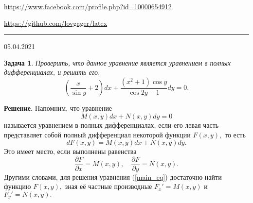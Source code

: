 \documentclass[12pt]{article}
\begin{document}


\begin{flushleft}
\url{https://www.facebook.com/profile.php?id=10000654912}

\url{https://github.com/lovgager/latex}
\end{flushleft}
\hrule 
\begin{flushright}
05.04.2021
\end{flushright}
\bigskip


\newtheorem*{task}{Задача}
\begin{task}
Проверить, что данное уравнение является уравнением в полных дифференциалах, и решить его.
\begin{equation} \label{task_eq}
    \left(\frac{x}{\sin{y}}+2\right)dx + \frac{(x^2+1) \cos{y}}{\cos{2y}-1}dy = 0. 
\end{equation}
\end{task}

\noindent\textbf{Решение.} Напомним, что уравнение
\begin{equation}\label{main_eq}
    M(x,y)dx + N(x,y)dy = 0
\end{equation}
называется уравнением в полных дифференциалах, если его левая часть представляет собой полный дифференциал некоторой функции $F(x,y),$ то есть 
\begin{equation*}
    dF(x,y) = M(x,y)dx + N(x,y)dy.
\end{equation*}
Это имеет место, если выполнены равенства
\begin{equation}\label{partial_der}
    \frac{\partial F}{\partial x} = M(x,y), \quad \frac{\partial F}{\partial y} = N(x,y).
\end{equation}
Другими словами, для решения уравнения (\ref{main_eq}) достаточно найти функцию $F(x,y),$ зная её частные производные $F_x' = M(x,y)$ и $F_y' = N(x,y).$ 
\end{document}
